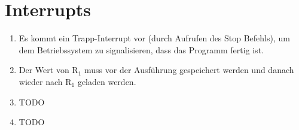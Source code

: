 \documentclass[DIN, pagenumber=false, fontsize=11pt, parskip=half]{scrartcl}
\begin{document}
    \section{Interrupts}
    \begin{enumerate}[label=(\alph*)]
        \item Es kommt ein Trapp-Interrupt vor (durch Aufrufen des Stop Befehls), um dem Betriebssystem zu signalisieren, dass das Programm fertig ist.
        \item Der Wert von $\text{R}_1$ muss vor der Ausführung
            gespeichert werden und danach wieder nach $\text{R}_1$ 
            geladen werden.
        \item TODO
        \item TODO
    \end{enumerate}
\end{document}
